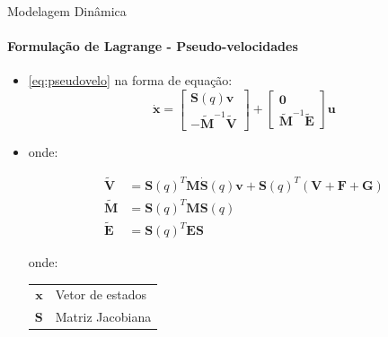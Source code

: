 \documentclass{beamer}
\begin{document}
\begin{frame}{Modelagem Dinâmica}
    \framesubtitle{Formulação de Lagrange - Pseudo-velocidades}
    \begin{itemize}
        \item \eqref{eq:pseudovelo} na forma de equação:
              \begin{equation*}
                  \mathbf{\dot{x}} =
                  \begin{bmatrix}
                      \mathbf{S}(q)\mathbf{v} \\
                      \mathbf{-\tilde{M}}^{-1}\mathbf{\tilde{V}}
                  \end{bmatrix}
                  +
                  \begin{bmatrix}
                      \mathbf{0} \\
                      \mathbf{\tilde{M}}^{-1}\mathbf{\tilde{E}}
                  \end{bmatrix} \mathbf{u}
              \end{equation*}

        \item onde:

              \begin{equation*}
                  \begin{split}
                      \mathbf{\tilde{V}} & =
                      \mathbf{S}(q)^T\mathbf{M}\mathbf{\dot{S}}(q)\mathbf{v} + \mathbf{S}(q)^T (\mathbf{V + F + G})\\
                      \mathbf{\tilde{M}} & = \mathbf{S}(q)^T\mathbf{M}\mathbf{S}(q)\\
                      \mathbf{\tilde{E}} & = \mathbf{S}(q)^T\mathbf{E}\mathbf{S}
                  \end{split}
              \end{equation*}

              \begin{block}{}
                  \scriptsize{
                      onde:
                      \begin{tabular}{ r | l }
                          $\mathbf{x}$ & Vetor de estados \\
                          $\mathbf{S}$ & Matriz Jacobiana \\
                      \end{tabular}}
              \end{block}


    \end{itemize}
\end{frame}
\end{document}
